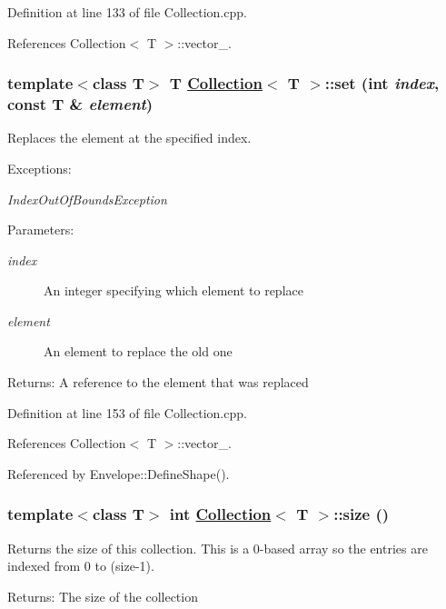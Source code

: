 Definition at line 133 of file Collection.cpp.

References Collection$<$ T $>$::vector\_\-.\hypertarget{classCollection_a9}{
\subsubsection[set]{\setlength{\rightskip}{0pt plus 5cm}template$<$class T$>$ T \hyperlink{classCollection}{Collection}$<$ T $>$::set (int {\em index}, const T \& {\em element})}}
\label{classCollection_a9}


Replaces the element at the specified index. \begin{Desc}
\item[Exceptions:]
\begin{description}
\item[{\em Index\-Out\-Of\-Bounds\-Exception}]\end{description}
\end{Desc}
\begin{Desc}
\item[Parameters:]
\begin{description}
\item[{\em index}]An integer specifying which element to replace \item[{\em element}]An element to replace the old one \end{description}
\end{Desc}
\begin{Desc}
\item[Returns:]A reference to the element that was replaced \end{Desc}


Definition at line 153 of file Collection.cpp.

References Collection$<$ T $>$::vector\_\-.

Referenced by Envelope::Define\-Shape().\hypertarget{classCollection_a10}{
\subsubsection[size]{\setlength{\rightskip}{0pt plus 5cm}template$<$class T$>$ int \hyperlink{classCollection}{Collection}$<$ T $>$::size ()}}
\label{classCollection_a10}


Returns the size of this collection. This is a 0-based array so the entries are indexed from 0 to (size-1). \begin{Desc}
\item[Returns:]The size of the collection \end{Desc}


